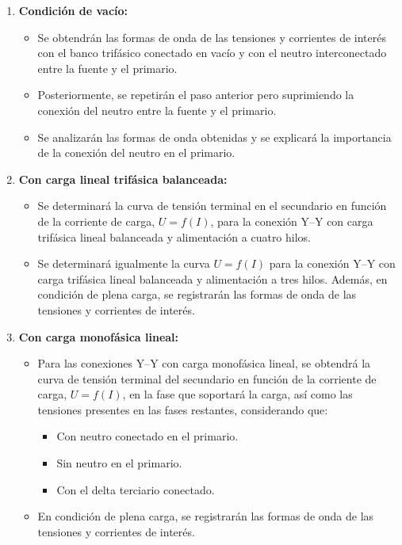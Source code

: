 \documentclass[12pt]{article}
\begin{document}
\begin{enumerate}
    \item \textbf{Condici\'on de vac\'io:}
    \begin{itemize}
        \item Se obtendr\'an las formas de onda de las tensiones y corrientes de inter\'es con el banco trif\'asico conectado en vac\'io y con el neutro interconectado entre la fuente y el primario.
        \item Posteriormente, se repetir\'an el paso anterior pero suprimiendo la conexi\'on del neutro entre la fuente y el primario.
        \item Se analizar\'an las formas de onda obtenidas y se explicar\'a la importancia de la conexi\'on del neutro en el primario.
    \end{itemize}
    \item \textbf{Con carga lineal trif\'asica balanceada:}
    \begin{itemize}
        \item Se determinar\'a la curva de tensi\'on terminal en el secundario en funci\'on de la corriente de carga, $U=f(I)$, para la conexi\'on Y--Y con carga trif\'asica lineal balanceada y alimentaci\'on a cuatro hilos.
        \item Se determinar\'a igualmente la curva $U=f(I)$ para la conexi\'on Y--Y con carga trif\'asica lineal balanceada y alimentaci\'on a tres hilos. Adem\'as, en condici\'on de plena carga, se registrar\'an las formas de onda de las tensiones y corrientes de inter\'es.
    \end{itemize}
    \item \textbf{Con carga monof\'asica lineal:}
    \begin{itemize}
        \item Para las conexiones Y--Y con carga monof\'asica lineal, se obtendr\'a la curva de tensi\'on terminal del secundario en funci\'on de la corriente de carga, $U=f(I)$, en la fase que soportar\'a la carga, as\'i como las tensiones presentes en las fases restantes, considerando que:
        \begin{itemize}
            \item Con neutro conectado en el primario.
            \item Sin neutro en el primario.
            \item Con el delta terciario conectado.
        \end{itemize}
        \item En condici\'on de plena carga, se registrar\'an las formas de onda de las tensiones y corrientes de inter\'es.
    \end{itemize}
\end{enumerate}
\end{document}
